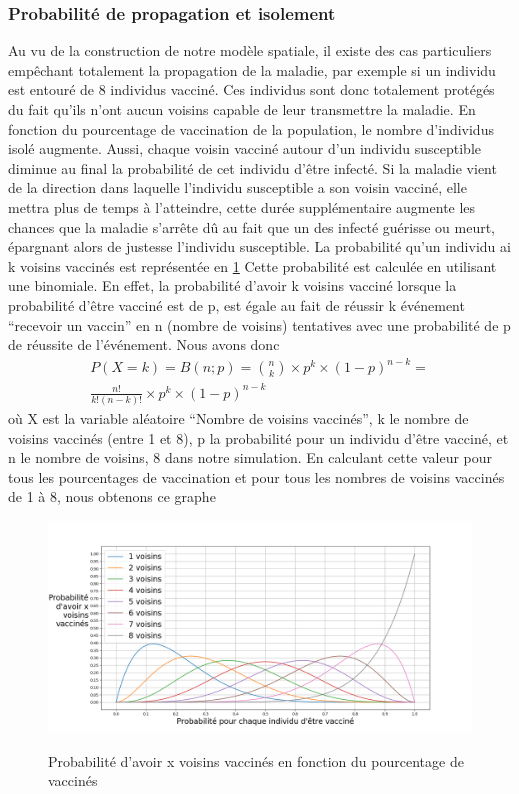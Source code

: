 \documentclass[journal, a4paper]{IEEEtran}
\begin{document}
	\subsubsection{Probabilité de propagation et isolement}
	Au vu de la construction de notre modèle spatiale, il existe des cas particuliers empêchant totalement la propagation de la maladie, par exemple si un individu est entouré de 8 individus vacciné.
	Ces individus sont donc totalement protégés du fait qu'ils n'ont aucun voisins capable de leur transmettre la maladie. En fonction du pourcentage de vaccination de la population, le nombre d'individus isolé augmente.
	Aussi, chaque voisin vacciné autour d'un individu susceptible diminue au final la probabilité de cet individu d'être infecté. Si la maladie vient de la direction dans laquelle l'individu susceptible a son voisin vacciné, elle mettra plus de temps à l'atteindre, cette durée supplémentaire augmente les chances que la maladie s'arrête dû au fait que un des infecté guérisse ou meurt, épargnant alors de justesse l'individu susceptible.
	La probabilité qu'un individu ai k voisins vaccinés est représentée en \ref{fig:probNeighbour}
	Cette probabilité est calculée en utilisant une binomiale. En effet, la probabilité d'avoir k voisins vacciné lorsque la probabilité d'être vacciné est de p, est égale au fait de réussir k événement ``recevoir un vaccin'' en n (nombre de voisins) tentatives avec une probabilité de p de réussite de l'événement. Nous avons donc
	\begin{equation}
	\begin{aligned}
		P(X = k) = B(n;p) = {n \choose k}\times p^k \times (1-p)^{n-k} = \\ \frac{n!}{k!(n-k)!}\times p^k \times (1-p)^{n-k}
	\end{aligned}
	\end{equation} où X est la variable aléatoire ``Nombre de voisins vaccinés'', k le nombre de voisins vaccinés (entre 1 et 8), p la probabilité pour un individu d'être vacciné, et n le nombre de voisins, 8 dans notre simulation. En calculant cette valeur pour tous les pourcentages de vaccination et pour tous les nombres de voisins vaccinés de 1 à 8, nous obtenons ce graphe

	\begin{figure}
		\caption{Probabilité d'avoir x voisins vaccinés en fonction du pourcentage de vaccinés}
		\includegraphics[scale=0.2]{probNeighbour}
		\label{fig:probNeighbour}
	\end{figure}
\end{document}
